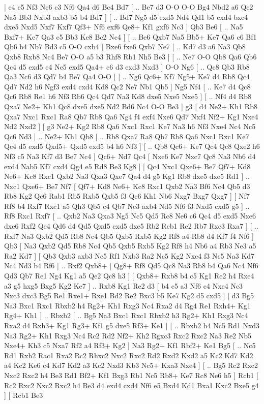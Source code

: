 \makegametitle 
|   e4   e5    Nf3   Nc6    c3   Nf6    Qa4   d6    Bc4   Bd7 [ .. Be7  d3 O-O  O-O Bg4  Nbd2 a6  Qc2 Na5  Bb3 Nxb3  axb3 b5  b4 Bd7   ]  [ .. Bd7  Ng5 d5  exd5 Nd4  Qd1 b5  cxd4 bxc4  dxe5 Nxd5  Nxf7 Kxf7  Qf3+ Nf6  exf6 Qe8+  Kf1 gxf6  Nc3   ]  Qb3   Be6 [ .. Na5  Bxf7+ Ke7  Qa3 c5  Bb3 Ke8  Bc2 Nc4   ]  [ .. Be6  Qxb7 Na5  Bb5+ Ke7  Qa6 c6  Bf1 Qb6  b4 Nb7  Bd3 c5  O-O cxb4   ]  Bxe6   fxe6    Qxb7   Ne7 [ .. Kd7  d3 a6  Na3 Qb8  Qxb8 Rxb8  Nc4 Be7  O-O a5  b3 Rhf8  Rb1 Nh5  Be3   ]  [ .. Ne7  O-O Qb8  Qa6 Qb6  Qc4 d5  exd5 e4  Ne5 exd5  Qa4+ c6  d3 exd3  Nxd3   ]  O-O   Ng6 [ .. Qc8  Qb3 Rb8  Qa3 Nc6  d3 Qd7  b4 Be7  Qa4 O-O   ]  [ .. Ng6  Qc6+ Kf7  Ng5+ Ke7  d4 Rb8  Qc4 Qd7  Nd2 h6  Ngf3 exd4  cxd4 Kd8  Qc2 Ne7  Nb1 Qb5   ]  Ng5   Nf4 [ .. Ke7  d4 Qc8  Qc6 Rb8  Re1 h6  Nf3 Rb6  Qc4 Qd7  Na3 Kd8  dxe5 Nxe5  Nxe5   ]  [ .. Nf4  d4 Rb8  Qxa7 Ne2+  Kh1 Qc8  dxe5 dxe5  Nd2 Bd6  Nc4 O-O  Be3   ]  g3 [  d4 Ne2+  Kh1 Rb8  Qxa7 Nxc1  Rxc1 Ra8  Qb7 Rb8  Qa6 Ng4  f4 exf4  Nxe6 Qd7  Nxf4 Nf2+  Kg1 Nxe4  Nd2 Nxd2   ]  [  g3 Ne2+  Kg2 Rb8  Qa6 Nxc1  Rxc1 Ke7  Na3 h6  Nf3 Nxe4  Nc4 Nc5  Qc6 Nd3   ] .. Ne2+    Kh1   Qb8 [ .. Rb8  Qxa7 Ra8  Qb7 Rb8  Qa6 Nxc1  Rxc1 Ke7  Qc4 d5  exd5 Qxd5+  Qxd5 exd5  b4 h6  Nf3   ]  [ .. Qb8  Qc6+ Ke7  Qc4 Qc8  Qxe2 h6  Nf3 c5  Na3 Kf7  d3 Be7  Nc4   ]  Qc6+   Nd7    Qc4 [  Nxe6 Ke7  Nxc7 Qc8  Na3 Nb6  d4 exd4  Nab5 Kf7  cxd4 Qg4  e5 Rd8  Be3 Kg8   ]  [  Qc4 Nxc1  Qxe6+ Be7  Qf7+ Kd8  Ne6+ Kc8  Rxc1 Qxb2  Na3 Qxa3  Qxe7 Qa4  d4 g5  Kg1 Rb8  dxe5 dxe5  Rd1   ] .. Nxc1    Qxe6+   Be7    Nf7 [  Qf7+ Kd8  Ne6+ Kc8  Rxc1 Qxb2  Na3 Bf6  Nc4 Qb5  d3 Rb8  Kg2 Qc6  Rab1 Rb5  Rxb5 Qxb5  f3 Qc6  Kh1 Nb6  Nxg7 Bxg7  Qxg7   ]  [  Nf7 Rf8  b4 Rxf7  Rxc1 a5  Qh3 Qb5  c4 Qb7  Nc3 axb4  Nd5 Nf6  f3 Nxd5  cxd5 g5   ] .. Rf8    Rxc1   Rxf7 [ .. Qxb2  Na3 Qxa3  Ng5 Nc5  Qd5 Rc8  Ne6 c6  Qc4 d5  exd5 Nxe6  dxe6 Rxf2  Qe4 Qd6  d4 Qd5  Qxd5 cxd5  dxe5 Rb2  Rcb1 Re2  Rb7 Rxc3  Rxa7   ]  [ .. Rxf7  Na3 Qxb2  Qd5 Rb8  Nc4 Qb5  Qxb5 Rxb5  Kg2 Rf8  a4 Rb8  d4 Kf7  f4 Nf6   ]  Qb3 [  Na3 Qxb2  Qd5 Rb8  Nc4 Qb5  Qxb5 Rxb5  Kg2 Rf8  h4 Nb6  a4 Rb3  Ne3 a5  Ra2 Kd7   ]  [  Qb3 Qxb3  axb3 Nc5  Rf1 Nxb3  Ra2 Nc5  Kg2 Nxe4  f3 Nc5  Na3 Kd7  Nc4 Nd3  b4 Rf6   ] .. Rxf2    Qxb8+ [  Qg8+ Rf8  Qd5 Qc8  Na3 Rb8  b4 Qa6  Nc4 Nf6  Qd3 Qb7  Re1 Ng4  Kg1 a5  Qe2 Qc8  h3   ]  [  Qxb8+ Rxb8  b4 c5  Kg1 Re2  h4 Rxe4  a3 g5  hxg5 Bxg5  Kg2 Ke7   ] .. Rxb8    Kg1   Re2    d3 [  b4 c5  a3 Nf6  c4 Nxe4  Nc3 Nxc3  dxc3 Bg5  Re1 Rxe1+  Rxe1 Bd2  Re2 Bxc3  b5 Ke7  Kg2 d5  cxd5   ]  [  d3 Bg5  Na3 Bxc1  Rxc1 Rbxb2  h4 Rg2+  Kh1 Rxg3  Nc4 Rxa2  d4 Rg4  Re1 Rxh4+  Kg1 Rg4+  Kh1   ] .. Rbxb2 [ .. Bg5  Na3 Bxc1  Rxc1 Rbxb2  h3 Rg2+  Kh1 Rxg3  Nc4 Rxa2  d4 Rxh3+  Kg1 Rg3+  Kf1 g5  dxe5 Rf3+  Ke1   ]  [ .. Rbxb2  h4 Nc5  Rd1 Nxd3  Na3 Rg2+  Kh1 Rxg3  Nc4 Rc2  Rd2 Nf2+  Kh2 Rgxc3  Rxc2 Rxc2  Na3 Re2  Nb5 Nxe4+  Kh3 c5  Nxa7 Rf2  a4 Rf3+  Kg2   ]  Na3   Rg2+    Kf1   Rbf2+    Ke1  Bg5 [ .. Nc5  Rd1 Rxh2  Rac1 Rxa2  Rc2 Rhxc2  Nxc2 Rxc2  Rd2 Rxd2  Kxd2 a5  Kc2 Kd7  Kd2 a4  Kc2 Ke6  c4 Kd7  Kd2 a3  Kc2 Nxd3  Kb3 Nc5+  Kxa3 Nxe4   ]  [ .. Bg5  Rc2 Rxc2  Nxc2 Rxc2  h4 Be3  Rd1 Bf2+  Kf1 Bxg3  Rb1 Nc5  Rb8+ Ke7  Rc8 Ne6  h5   ]  Rcb1 [  Rc2 Rxc2  Nxc2 Rxc2  h4 Be3  d4 exd4  cxd4 Nf6  e5 Bxd4  Kd1 Bxa1  Kxc2 Bxe5  g4   ]  [  Rcb1 Be3  